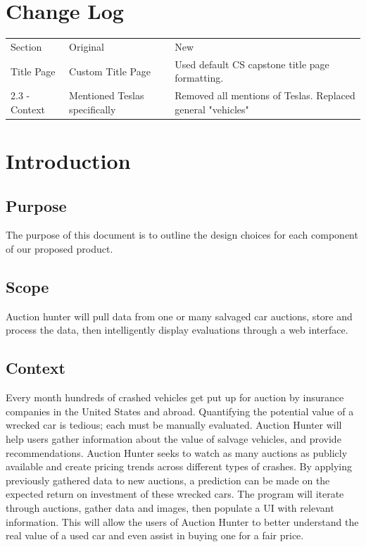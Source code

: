\documentclass[onecolumn, draftclsnofoot, 10pt, compsoc]{IEEEtran}
\begin{document}
\newpage
\tableofcontents

\section{Change Log}
\begin{table}[!h]
\begin{tabular}{p{4cm}|p{5cm}|p{7cm}}
Section & Original & New \\
\cline{1-3}
Title Page & Custom Title Page &   Used default CS capstone title page formatting.   \\
2.3 - Context       & Mentioned Teslas specifically        & Removed all mentions of Teslas. Replaced general "vehicles"   \\
\end{tabular}
\end{table}

\newpage



\section{Introduction}
\subsection{Purpose}
The purpose of this document is to outline the design choices for each component of our proposed product. 
\subsection{Scope}
Auction hunter will pull data from one or many salvaged car auctions, store and process the data, then intelligently display evaluations through a web interface. 
\subsection{Context}
Every month hundreds of crashed vehicles get put up for auction by insurance companies in the United States and abroad. Quantifying the potential value of a wrecked car is tedious; each must be manually evaluated. Auction Hunter will help users gather information about the value of salvage vehicles, and provide recommendations. Auction Hunter seeks to watch as many auctions as publicly available and create pricing trends across different types of crashes. By applying previously gathered data to new auctions, a prediction can be made on the expected return on investment of these wrecked cars. The program will iterate through auctions, gather data and images, then populate a UI with relevant information. This will allow the users of Auction Hunter to better understand the real value of a used car and even assist in buying one for a fair price.
\end{document}
